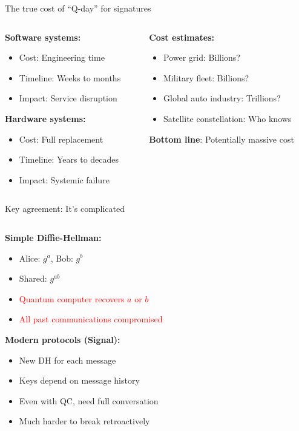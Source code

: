 \documentclass[aspectratio=169, lualatex, handout]{beamer}
\begin{document}
\begin{frame}{The true cost of ``Q-day'' for signatures}
	\begin{columns}[c]
		\begin{column}{0.5\textwidth}
			\textbf{Software systems:}
			\begin{itemize}
				\item Cost: Engineering time
				\item Timeline: Weeks to months
				\item Impact: Service disruption
			\end{itemize}
			\vspace{5mm}
			\textbf{Hardware systems:}
			\begin{itemize}
				\item Cost: Full replacement
				\item Timeline: Years to decades
				\item Impact: Systemic failure
			\end{itemize}
		\end{column}
		\begin{column}{0.5\textwidth}
			\textbf{Cost estimates:}
			\begin{itemize}
				\item Power grid: Billions?
				\item Military fleet: Billions?
				\item Global auto industry: Trillions?
				\item Satellite constellation: Who knows
			\end{itemize}
			\vspace{3mm}
			\textbf{Bottom line}: Potentially massive cost
		\end{column}
	\end{columns}
\end{frame}

\begin{frame}{Key agreement: It's complicated}
	\begin{columns}[c]
		\begin{column}{1\textwidth}
			\textbf{Simple Diffie-Hellman:}
			\begin{itemize}
				\item Alice: $g^a$, Bob: $g^b$
				\item Shared: $g^{ab}$
				\item \textcolor{red}{Quantum computer recovers $a$ or $b$}
				\item \textcolor{red}{All past communications compromised}
			\end{itemize}

			\textbf{Modern protocols (Signal):}
			\begin{itemize}
				\item New DH for each message
				\item Keys depend on message history
				\item Even with QC, need full conversation
				\item \textcolor{green!70!black}{Much harder to break retroactively}
			\end{itemize}
		\end{column}
	\end{columns}
\end{frame}
\end{document}
